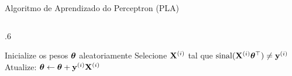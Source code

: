 \documentclass[aspectratio=169,xcolor=dvipsnames]{beamer}
\begin{document}
\begin{frame}{Algoritmo de Aprendizado do Perceptron (PLA)}


    
%



    
%

\begin{columns}
    \begin{column}{.6\textwidth}
    
        \begin{algorithmic}[1]
        \State Inicialize os pesos $\bm{\theta}$ aleatoriamente
          \State Selecione $\mathbf{X}^{(i)}$ tal que $\text{sinal}(\mathbf{X}^{(i)} \bm{\theta}^\top) \neq \mathbf{y}^{(i)}$
          \State Atualize: $\bm{\theta} \gets \bm{\theta} + \mathbf{y}^{(i)} \mathbf{X}^{(i)}$
        \EndWhile
        \end{algorithmic}
        \vspace{10pt}
        

\end{column}
\end{columns}
\end{frame}
\end{document}
